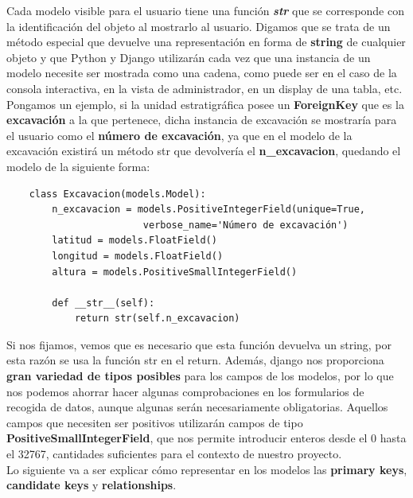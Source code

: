     Cada modelo visible para el usuario tiene una función \textbf{\textit{str}} que se
    corresponde con la identificación del objeto al mostrarlo al usuario. Digamos que se
    trata de un método especial que devuelve una representación en forma de \textbf{string} de
    cualquier objeto y que Python y Django utilizarán cada vez que una instancia de un 
    modelo necesite ser mostrada como una cadena, como puede ser en el caso de la consola
    interactiva, en la vista de administrador, en un display de una tabla, etc.\\

    Pongamos un ejemplo, si la unidad estratigráfica posee un \textbf{ForeignKey} que es
    la \textbf{excavación} a la que pertenece, dicha instancia de excavación se mostraría
    para el usuario como el \textbf{número de excavación}, ya que en el modelo de la
    excavación existirá un método str que devolvería el \textbf{n\_excavacion},
    quedando el modelo de la siguiente forma:

    \begin{verbatim}
    class Excavacion(models.Model):
        n_excavacion = models.PositiveIntegerField(unique=True, 
                        verbose_name='Número de excavación')
        latitud = models.FloatField()
        longitud = models.FloatField()
        altura = models.PositiveSmallIntegerField()

        def __str__(self):
            return str(self.n_excavacion)
    \end{verbatim}

    Si nos fijamos, vemos que es necesario que esta función devuelva un string, por esta
    razón se usa la función str en el return. Además, django nos proporciona \textbf{gran
    variedad de tipos posibles} para los campos de los modelos, por lo que nos podemos
    ahorrar hacer algunas comprobaciones en los formularios de recogida de datos, aunque
    algunas serán necesariamente obligatorias. Aquellos campos que necesiten ser positivos
    utilizarán campos de tipo \textbf{PositiveSmallIntegerField}, que nos permite introducir
    enteros desde el 0 hasta el 32767, cantidades suficientes para el contexto de nuestro
    proyecto.\\

    Lo siguiente va a ser explicar cómo representar en los modelos las \textbf{primary keys},
    \textbf{candidate keys} y \textbf{relationships}.\\
    
